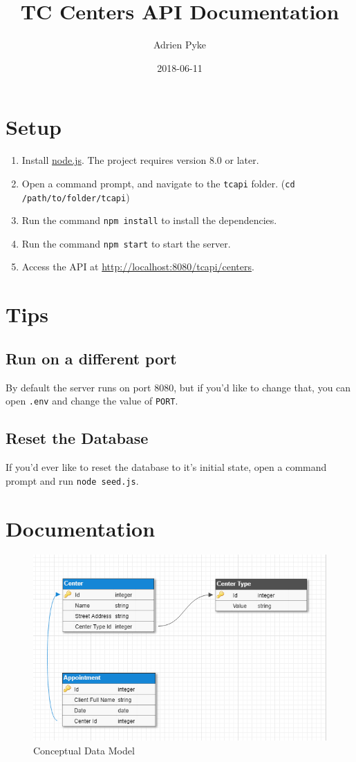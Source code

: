 \documentclass{article}
\title{TC Centers API Documentation}
\date{2018-06-11}
\author{Adrien Pyke}
\begin{document}
	\maketitle
	\newpage

	\section{Setup}
	\begin{enumerate}
		\item Install \href{https://nodejs.org/en/}{node.js}. The project requires version 8.0 or later.
		\item Open a command prompt, and navigate to the \texttt{tcapi} folder. (\texttt{cd /path/to/folder/tcapi})
		\item Run the command \texttt{npm install} to install the dependencies.
		\item Run the command \texttt{npm start} to start the server.
		\item Access the API at \url{http://localhost:8080/tcapi/centers}.
	\end{enumerate}

	\section{Tips}

	\subsection{Run on a different port}
	By default the server runs on port 8080, but if you'd like to change that, you can open \texttt{.env} and change the value of \texttt{PORT}.

	\subsection{Reset the Database}
	If you'd ever like to reset the database to it's initial state, open a command prompt and run \texttt{node seed.js}.

	\newpage

	\section{Documentation}
	\begin{figure}[h!]
		\includegraphics[width=\linewidth]{data-model.png}
		\caption{Conceptual Data Model}
		\label{fig:datamodel}
	\end{figure}
\end{document}
